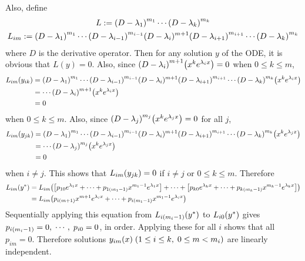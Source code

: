 \documentclass[10pt]{article}
\begin{document}
\vspace{2mm}
Also, define
\begin{gather*}
    L := \qty(D-\lambda_1)^{m_1}\cdots\qty(D-\lambda_k)^{m_k} \\
    L_{im} := \qty(D-\lambda_1)^{m_1}\cdots\qty(D-\lambda_{i-1})^{m_{i-1}}(D-\lambda_i)^{m+1}\qty(D-\lambda_{i+1})^{m_{i+1}}\cdots\qty(D-\lambda_k)^{m_k}
\end{gather*}
where $D$ is the derivative operator.
Then for any solution $y$ of the ODE, it is obvious that $L(y) = 0$.
Also, since $\qty(D-\lambda_i)^{m+1}\qty(x^{k}e^{\lambda_ix}) = 0$ when $0 \leq k \leq m$,
\begin{align*}
    L_{im}\qty(y_{ik}) &= \qty(D-\lambda_1)^{m_1}\cdots\qty(D-\lambda_{i-1})^{m_{i-1}}(D-\lambda_i)^{m+1}\qty(D-\lambda_{i+1})^{m_{i+1}}\cdots\qty(D-\lambda_k)^{m_k}\qty(x^ke^{\lambda_ix}) \\
    &= \cdots\qty(D-\lambda_i)^{m+1}\qty(x^ke^{\lambda_ix}) \\
    &= 0
\end{align*} 
when $0 \leq k \leq m$. Also, since $\qty(D-\lambda_j)^{m_j}\qty(x^{k}e^{\lambda_jx}) = 0$ for all $j$, 
\begin{align*}
    L_{im}\qty(y_{jk}) &= \qty(D-\lambda_1)^{m_1}\cdots\qty(D-\lambda_{i-1})^{m_{i-1}}(D-\lambda_i)^{m+1}\qty(D-\lambda_{i+1})^{m_{i+1}}\cdots\qty(D-\lambda_k)^{m_k}\qty(x^ke^{\lambda_jx}) \\
    &= \cdots\qty(D-\lambda_j)^{m_j}\qty(x^{k}e^{\lambda_jx}) \\
    &= 0
\end{align*}
when $i \neq j$. This shows that $L_{im}\qty(y_{jk}) = 0$ if $i \neq j$ or $0 \leq k \leq m$.
Therefore 
\begin{align*}
    L_{im}(y^{*}) &= L_{im}\qty(\qty[p_{10}e^{\lambda_1x} + \cdots + p_{1(m_1-1)}x^{m_1-1}e^{\lambda_1x}] + \cdots + \qty[p_{k0}e^{\lambda_kx} + \cdots + p_{k(m_k-1)}x^{m_k-1}e^{\lambda_kx}]) \\
    &= L_{im}\qty(p_{i(m+1)}x^{m+1}e^{\lambda_ix} + \cdots + p_{i\qty(m_1-1)}x^{m_1-1}e^{\lambda_ix})
\end{align*}
Sequentially applying this equation from $L_{i\qty(m_i-1)}\qty(y^{*})$ to $L_{i0}\qty(y^{*})$ gives $p_{i\qty(m_i-1)} = 0, \; \cdots ,\; p_{i0} = 0$, in order.
Applying these for all $i$ shows that all $p_{im} = 0$. Therefore solutions $y_{im}(x) \; \qty(1 \leq i\leq k, \; 0 \leq m < m_i)$ are linearly independent.
\end{document}
